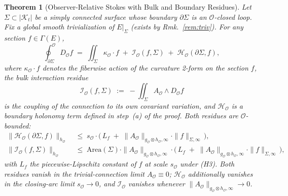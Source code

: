 \documentclass[11pt]{article}
\newtheorem{theorem}{Theorem}
\newcommand{\Kt}{\mathcal{K}_t}
\newcommand{\sO}{s_{\mathcal{O}}}  %
\newcommand{\Obs}{\mathcal{O}}
\newcommand{\kappaO}{\kappa_{\Obs}}
\newcommand{\HolO}{\mathcal{H}_{\Obs}}
\newcommand{\IntO}{\mathcal{I}_{\Obs}}
\newcommand{\AO}{A_{\Obs}}
\newcommand{\gO}{g_{\Obs}}
\newcommand{\hO}{h_{\Obs}}
\newcommand{\DO}{D_{\Obs}}
\newcommand{\EE}{E}
\newcommand{\Sect}{\Gamma}
\begin{document}
\begin{theorem}[Observer-Relative Stokes with Bulk and Boundary Residues]
\label{thm:ostokes}
Let $\Sigma \subset |\Kt|$ be a simply connected surface whose
boundary $\partial\Sigma$ is an $\Obs$-closed loop. Fix a global
smooth trivialization of $\EE|_\Sigma$ (exists by
Rmk.~\ref{rem:triv}). For any section $f \in \Sect(\EE)$,
\begin{equation}
\oint_{\partial\Sigma}^{\Obs} \DO f
\;=\; \iint_\Sigma \kappaO \cdot f
\;+\; \IntO(f, \Sigma)
\;+\; \HolO(\partial\Sigma, f),
\label{eq:ostokes}
\end{equation}
where $\kappaO \cdot f$ denotes the fiberwise action of the
curvature 2-form on the section $f$, the \emph{bulk interaction
residue}
\begin{equation}
\IntO(f, \Sigma) \;:=\; -\iint_\Sigma \AO \wedge \DO f
\label{eq:intres}
\end{equation}
is the coupling of the connection to its own covariant variation,
and $\HolO$ is a \emph{boundary holonomy term} defined in step~(a)
of the proof. Both residues are $\Obs$-bounded:
\begin{align}
\|\HolO(\partial\Sigma, f)\|_{\hO} &\;\leq\; \sO \cdot
\big(\, L_f \;+\; \|\AO\|_{\gO \otimes \hO, \infty} \cdot \|f\|_{\Sigma, \infty}\, \big),
\label{eq:holbound}\\
\|\IntO(f, \Sigma)\|_{\hO} &\;\leq\;
\mathrm{Area}(\Sigma) \cdot \|\AO\|_{\gO \otimes \hO, \infty} \cdot
\big(\, L_f \;+\; \|\AO\|_{\gO \otimes \hO, \infty} \cdot \|f\|_{\Sigma, \infty}\, \big),
\label{eq:intbound}
\end{align}
with $L_f$ the piecewise-Lipschitz constant of $f$ at scale $\sO$
under (H3). Both residues vanish in the trivial-connection limit
$\AO \equiv 0$; $\HolO$ additionally vanishes in the closing-arc
limit $\sO \to 0$, and $\IntO$ vanishes whenever
$\|\AO\|_{\gO \otimes \hO, \infty} \to 0$.
\end{theorem}
\end{document}
